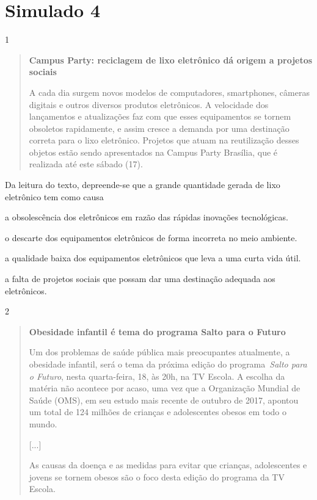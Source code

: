 
\section{Simulado 4}

\num{1}

\begin{quote}
\textbf{Campus Party: reciclagem de lixo eletrônico dá origem a projetos
sociais}

A cada dia surgem novos modelos de computadores, smartphones, câmeras
digitais e outros diversos produtos eletrônicos. A velocidade dos
lançamentos e atualizações faz com que esses equipamentos se tornem
obsoletos rapidamente, e assim cresce a demanda por uma destinação
correta para o lixo eletrônico. Projetos que atuam na reutilização
desses objetos estão sendo apresentados na Campus Party Brasília, que é
realizada até este sábado (17).
\end{quote}


Da leitura do texto, depreende-se que a grande quantidade gerada de lixo
eletrônico tem como causa

\begin{escolha}
\item a obsolescência dos eletrônicos em razão das rápidas inovações
tecnológicas.

\item o descarte dos equipamentos eletrônicos de forma incorreta no meio
ambiente.

\item a qualidade baixa dos equipamentos eletrônicos que leva a uma curta
vida útil.

\item a falta de projetos sociais que possam dar uma destinação adequada
aos eletrônicos.
\end{escolha}

\num{2}

\begin{quote}
\textbf{Obesidade infantil é tema do programa Salto para o Futuro}

Um dos problemas de saúde pública mais preocupantes atualmente, a
obesidade infantil, será o tema da próxima edição do
programa~\emph{Salto para o Futuro}, nesta quarta-feira, 18, às 20h, na
TV Escola. A escolha da matéria não acontece por acaso, uma vez que a
Organização Mundial de Saúde (OMS), em seu estudo mais recente de
outubro de 2017, apontou um total de 124 milhões de crianças e
adolescentes obesos em todo o mundo.

{[}...{]}

As causas da doença e as medidas para evitar que crianças, adolescentes
e jovens se tornem obesos são o foco desta edição do programa da TV
Escola.
\end{quote}

